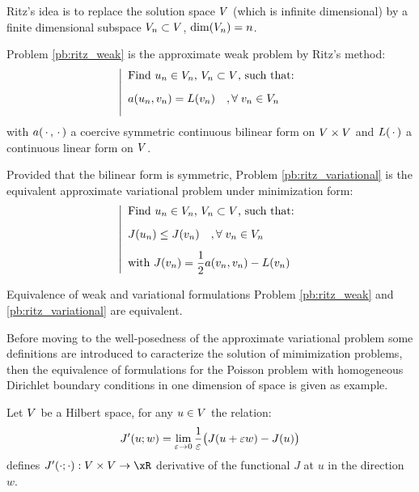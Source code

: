 Ritz's idea is to replace the solution space ${V}$ (which is infinite dimensional) by a finite dimensional subspace ${V}_n \subset {V}$, $\dim({V}_n) = n$.

\medskip
Problem \eqref{pb:ritz_weak} is the approximate weak problem by Ritz's method:
\begin{equation}\label{pb:ritz_weak}
\left\lvert
\begin{array}{ll}
\mbox{Find $u_n \in {V}_n$, ${V}_n \subset {V}$, such that:}\\[2ex]
a( u_n, v_n ) = L(v_n)\quad,{\forall\;}  v_n \in {V}_n\\[2ex]
\end{array}
\right .
\end{equation}
with $a(\,{\mathbf\cdot}\,,\,{\mathbf\cdot}\,)$ a coercive symmetric continuous bilinear form on ${V}\times{V}$ and $L(\,{\mathbf\cdot}\,)$ a continuous linear form on ${V}$.

\medskip
Provided that the bilinear form is symmetric, Problem \eqref{pb:ritz_variational} is the equivalent approximate variational problem under minimization form:
\begin{equation}\label{pb:ritz_variational}
\left\lvert
\begin{array}{ll}
\mbox{Find $u_n \in {V}_n$, ${V}_n \subset {V}$, such that:}\\[2ex]
J(u_n) \leq J(v_n)\quad,{\forall\;}  v_n \in {V}_n\\[2ex]
\mbox{with $J(v_n) = \displaystyle\frac{1}{2} a(v_n,v_n) - L(v_n)$}
\end{array}
\right .
\end{equation}

\begin{prpstn}{Equivalence of weak and variational formulations}
Problem \ref{pb:ritz_weak} and \ref{pb:ritz_variational} are equivalent.
\end{prpstn}

\medskip
Before moving to the well-posedness of the approximate variational problem some definitions are introduced to caracterize the solution of mimimization problems, then the equivalence of formulations for the Poisson problem with homogeneous Dirichlet boundary conditions in one dimension of space is given as example.


\begin{dfntn}
Let ${V}$ be a Hilbert space, for any $u\in{V}$ the relation:
\begin{equation}\label{eq:directional_derivative}
J'(u; w) = \lim_{\varepsilon\rightarrow 0} \displaystyle \frac{1}{\varepsilon}\bigr( J(u + \varepsilon w) - J(u) \bigl)
\end{equation}
defines $J'(\cdot; \cdot): \xV\times\xV \rightarrow\xR$ derivative of the functional $J$ at $u$ in the direction $w$.
\end{dfntn}

